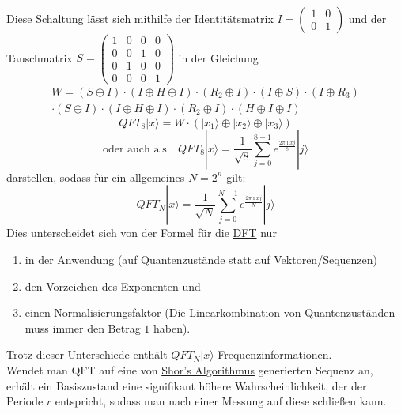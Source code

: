 \\Diese Schaltung lässt sich mithilfe der Identitätsmatrix \(I = \begin{pmatrix}
	1 & 0 \\
	0 & 1 
\end{pmatrix}\) und der Tauschmatrix \(S = \begin{pmatrix}
	1 & 0 & 0 & 0\\
	0 & 0 & 1 & 0\\
	0 & 1 & 0 & 0\\
	0 & 0 & 0 & 1
\end{pmatrix}\) in der Gleichung
\begin{multline}
	W = (S\oplus I)\cdot (I \oplus H \oplus I) \cdot (R_2 \oplus I) \cdot (I \oplus S) \cdot (I\oplus R_3)\\ \cdot (S \oplus I) \cdot (I \oplus H \oplus I) \cdot (R_2 \oplus I) \cdot (H \oplus I \oplus I)
\end{multline}
\[QFT_8 |x\rangle = W \cdot \left(|x_1\rangle \oplus |x_2\rangle \oplus |x_3\rangle\right)\]
\[\text{oder auch als}\quad QFT_8 |x\rangle = \frac{1}{\sqrt{8}}\sum_{j=0}^{8-1} e^{\frac{2\pi \imath x j}{8}}|j\rangle\]
darstellen, sodass für ein allgemeines \(N = 2^n\) gilt:
\[QFT_N |x\rangle = \frac{1}{\sqrt{N}}\sum_{j=0}^{N-1} e^{\frac{2\pi \imath x j}{N}}|j\rangle\]
Dies unterscheidet sich von der Formel für die \hyperref[sec:DFT]{DFT} nur
\begin{enumerate}
	\item in der Anwendung (auf Quantenzustände statt auf Vektoren/Sequenzen)
	\item den Vorzeichen des Exponenten und
	\item einen Normalisierungsfaktor (Die Linearkombination von Quantenzuständen muss immer den Betrag \(1\) haben).
\end{enumerate}
Trotz dieser Unterschiede enthält \(QFT_N |x\rangle\) Frequenzinformationen.\\
Wendet man QFT auf eine von \hyperref[sec:shor]{Shor's Algorithmus} generierten Sequenz an, erhält ein Basiszustand eine signifikant höhere Wahrscheinlichkeit, der der Periode \(r\) entspricht, sodass man nach einer Messung auf diese schließen kann.